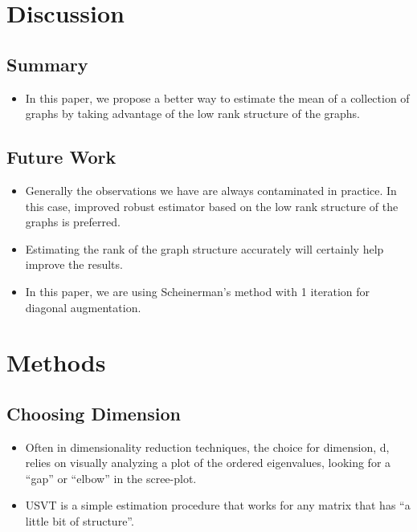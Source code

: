 \documentclass[a4paper]{article}
\begin{document}
\section{Discussion}

\subsection{Summary}
\begin{itemize}
\item In this paper, we propose a better way to estimate the mean of a collection of graphs by taking advantage of the low rank structure of the graphs.
\end{itemize}

\subsection{Future Work}
\begin{itemize}
\item Generally the observations we have are always contaminated in practice. In this case, improved robust estimator based on the low rank structure of the graphs is preferred.
\item Estimating the rank of the graph structure accurately will certainly help improve the results.
\item In this paper, we are using Scheinerman's method with 1 iteration for diagonal augmentation.
\end{itemize}






\section{Methods}

\subsection{Choosing Dimension}
\begin{itemize}
\item Often in dimensionality reduction techniques, the choice for dimension, d, relies on visually analyzing a plot of the ordered eigenvalues, looking for a ``gap'' or ``elbow'' in the scree-plot.
\item USVT is a simple estimation procedure that works for any matrix that has ``a little bit of structure''.
\end{itemize}
\end{document}
